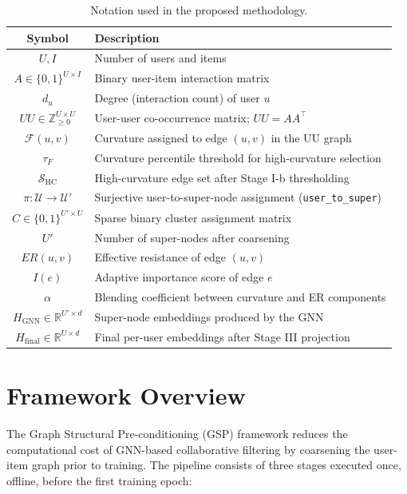 \begin{table}[h!]
\centering
\caption{Notation used in the proposed methodology.}
\label{tab:notation}
\begin{tabular}{@{}cl@{}}
\toprule
\textbf{Symbol} & \textbf{Description} \\
\midrule
$U, I$ & Number of users and items \\
$A \in \{0,1\}^{U \times I}$ & Binary user-item interaction matrix \\
$d_u$ & Degree (interaction count) of user $u$ \\
$UU \in \mathbb{Z}_{\ge 0}^{U \times U}$ & User-user co-occurrence matrix; $UU = A A^\top$ \\
$\mathcal{F}(u,v)$ & Curvature assigned to edge $(u,v)$ in the UU graph \\
$\tau_F$ & Curvature percentile threshold for high-curvature selection \\
$\mathcal{S}_\text{HC}$ & High-curvature edge set after Stage I-b thresholding \\
$\pi: \mathcal{U} \to \mathcal{U}'$ & Surjective user-to-super-node assignment (\texttt{user\_to\_super}) \\
$C \in \{0,1\}^{U' \times U}$ & Sparse binary cluster assignment matrix \\
$U'$ & Number of super-nodes after coarsening \\
$ER(u,v)$ & Effective resistance of edge $(u,v)$ \\
$I(e)$ & Adaptive importance score of edge $e$ \\
$\alpha$ & Blending coefficient between curvature and ER components \\
$H_\text{GNN} \in \mathbb{R}^{U' \times d}$ & Super-node embeddings produced by the GNN \\
$H_\text{final} \in \mathbb{R}^{U \times d}$ & Final per-user embeddings after Stage III projection \\
\bottomrule
\end{tabular}
\end{table}

\section{Framework Overview}

The Graph Structural Pre-conditioning (GSP) framework reduces the computational cost of GNN-based collaborative filtering by coarsening the user-item graph prior to training. The pipeline consists of three stages executed once, offline, before the first training epoch:

